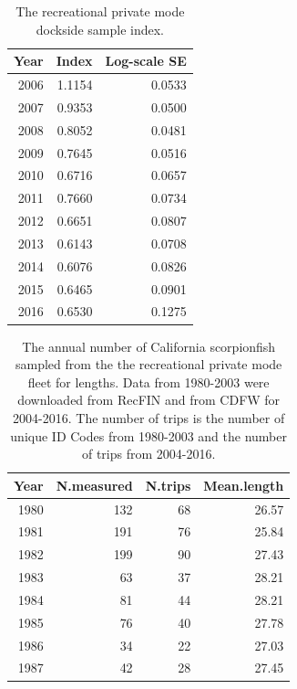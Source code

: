 \documentclass[12pt,]{article}
\begin{document}
\begin{table}[ht]
\centering
\caption{The recreational private mode 
                                            dockside sample index.} 
\label{tab:Fleet4_RecPR_dockside_index}
\begin{tabular}{rrr}
  \hline
Year & Index & Log-scale SE \\ 
  \hline
 2006 & 1.1154 & 0.0533 \\ 
   2007 & 0.9353 & 0.0500 \\ 
   2008 & 0.8052 & 0.0481 \\ 
   2009 & 0.7645 & 0.0516 \\ 
   2010 & 0.6716 & 0.0657 \\ 
   2011 & 0.7660 & 0.0734 \\ 
   2012 & 0.6651 & 0.0807 \\ 
   2013 & 0.6143 & 0.0708 \\ 
   2014 & 0.6076 & 0.0826 \\ 
   2015 & 0.6465 & 0.0901 \\ 
   2016 & 0.6530 & 0.1275 \\ 
   \hline
\end{tabular}
\end{table}\begin{table}[ht]
\centering
\caption{The annual number of California scorpionfish 
                                              sampled from the the recreational private 
                                              mode fleet for lengths. Data from 1980-2003
                                            were downloaded from RecFIN and from CDFW for
                                            2004-2016. The number of trips is the number
                                            of unique ID Codes from 1980-2003 and the 
                                            number of trips from 2004-2016.} 
\label{tab:Fleet4_lengthsample}
\begin{tabular}{rrrr}
  \hline
Year & N.measured & N.trips & Mean.length \\ 
  \hline
1980 & 132 &  68 & 26.57 \\ 
  1981 & 191 &  76 & 25.84 \\ 
  1982 & 199 &  90 & 27.43 \\ 
  1983 &  63 &  37 & 28.21 \\ 
  1984 &  81 &  44 & 28.21 \\ 
  1985 &  76 &  40 & 27.78 \\ 
  1986 &  34 &  22 & 27.03 \\ 
  1987 &  42 &  28 & 27.45 \\ 

\end{tabular}
\end{table}
\end{document}
